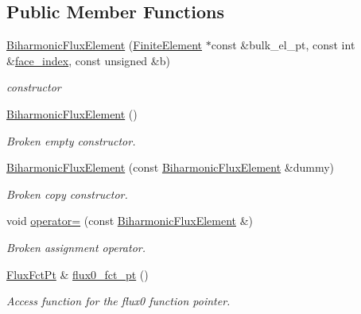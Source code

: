 \subsection*{Public Member Functions}
\begin{DoxyCompactItemize}
\item 
\hyperlink{classoomph_1_1BiharmonicFluxElement_adbb8aa4037b31be337cd9aaa0d9b1fee}{Biharmonic\+Flux\+Element} (\hyperlink{classoomph_1_1FiniteElement}{Finite\+Element} $\ast$const \&bulk\+\_\+el\+\_\+pt, const int \&\hyperlink{classoomph_1_1FaceElement_a478d577ac6db67ecc80f1f02ae3ab170}{face\+\_\+index}, const unsigned \&b)
\begin{DoxyCompactList}\small\item\em constructor \end{DoxyCompactList}\item 
\hyperlink{classoomph_1_1BiharmonicFluxElement_ab640d11e2bc26ac42a639fb2ed0627c2}{Biharmonic\+Flux\+Element} ()
\begin{DoxyCompactList}\small\item\em Broken empty constructor. \end{DoxyCompactList}\item 
\hyperlink{classoomph_1_1BiharmonicFluxElement_a471a32aff811268bb75a138f7d8f4204}{Biharmonic\+Flux\+Element} (const \hyperlink{classoomph_1_1BiharmonicFluxElement}{Biharmonic\+Flux\+Element} \&dummy)
\begin{DoxyCompactList}\small\item\em Broken copy constructor. \end{DoxyCompactList}\item 
void \hyperlink{classoomph_1_1BiharmonicFluxElement_a6e2481c449904d5c9a877d4233f3e9a2}{operator=} (const \hyperlink{classoomph_1_1BiharmonicFluxElement}{Biharmonic\+Flux\+Element} \&)
\begin{DoxyCompactList}\small\item\em Broken assignment operator. \end{DoxyCompactList}\item 
\hyperlink{classoomph_1_1BiharmonicFluxElement_a0fafeac48951b37cf5cd86aa486945a8}{Flux\+Fct\+Pt} \& \hyperlink{classoomph_1_1BiharmonicFluxElement_a15b9cb28dcbe2d192cc5c6041ec31f0f}{flux0\+\_\+fct\+\_\+pt} ()
\begin{DoxyCompactList}\small\item\em Access function for the flux0 function pointer. \end{DoxyCompactList}\item 

\end{DoxyCompactItemize}
